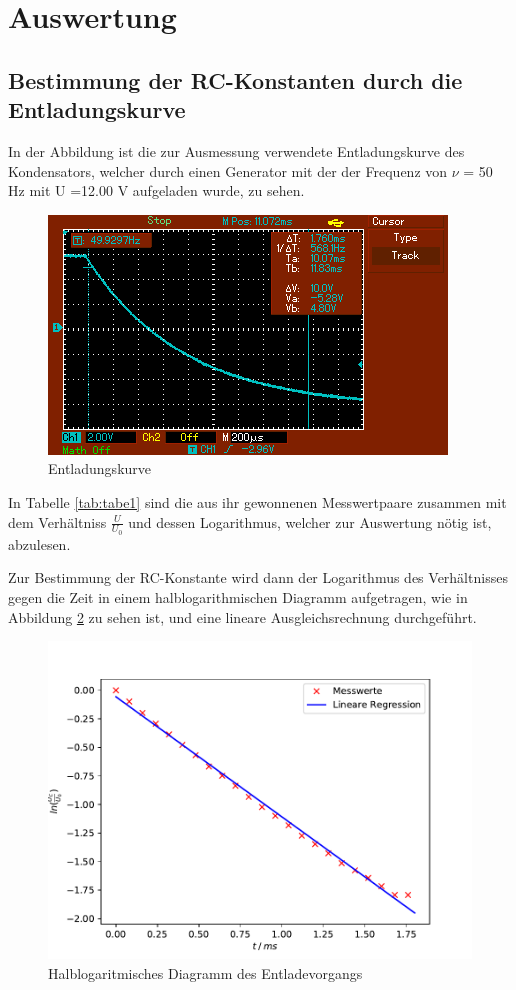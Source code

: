 \section{Auswertung}
\subsection{Bestimmung der RC-Konstanten durch die Entladungskurve}
In der Abbildung %
ist die zur Ausmessung verwendete Entladungskurve des Kondensators, welcher
durch einen Generator mit der der Frequenz von $\nu$ = 50 $\si{\hertz}$ mit
 U =12.00 $\si{\volt}$ aufgeladen wurde, zu sehen.
\begin{figure}[H]
  \centering
  \includegraphics{kurve}
  \caption{Entladungskurve}
  \label{fig:kurve}
\end{figure}
In Tabelle \ref{tab:tabe1} sind die aus ihr gewonnenen Messwertpaare zusammen mit
dem Verhältniss $ \frac{U}{U_0} $ und dessen Logarithmus, welcher zur
Auswertung nötig ist, abzulesen.

Zur Bestimmung der RC-Konstante wird dann der Logarithmus des Verhältnisses gegen
die Zeit in einem halblogarithmischen Diagramm aufgetragen, wie in Abbildung
\ref{fig:gerade} zu sehen ist, und eine lineare Ausgleichsrechnung durchgeführt.
\begin{figure}[H]
  \centering
  \includegraphics{plot1.pdf}
  \caption{Halblogaritmisches Diagramm des Entladevorgangs}
  \label{fig:gerade}
\end{figure}
